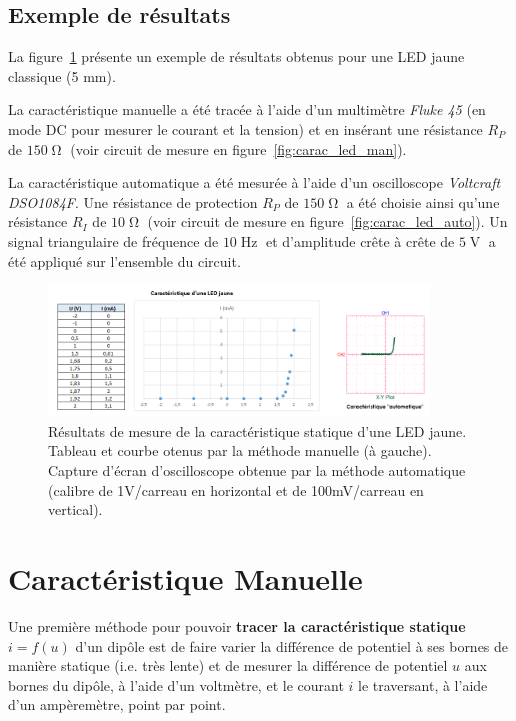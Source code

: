 \bigskip

\subsection{Exemple de résultats}

La figure~\ref{fig:carac_led} présente un exemple de résultats obtenus pour une LED jaune classique (5 mm).

La caractéristique manuelle a été tracée à l'aide d'un multimètre \textit{Fluke 45} (en mode DC pour mesurer le courant et la tension) et en insérant une résistance $R_P$ de $150\operatorname{\Omega}$ (voir circuit de mesure en figure~\ref{fig:carac_led_man}).

La caractéristique automatique a été mesurée à l'aide d'un oscilloscope \textit{Voltcraft DSO1084F}. Une résistance de protection $R_P$ de $150\operatorname{\Omega}$ a été choisie ainsi qu'une résistance $R_I$ de $10\operatorname{\Omega}$ (voir circuit de mesure en figure~\ref{fig:carac_led_auto}). Un signal triangulaire de fréquence de $10\operatorname{Hz}$ et d'amplitude crête à crête de $5\operatorname{V}$ a été appliqué sur l'ensemble du circuit. 



\begin{figure}[h!]
    \centering
	\includegraphics[width=0.9\textwidth]{images/caract_led_phd.png}

    \caption{Résultats de mesure de la caractéristique statique d'une LED jaune. Tableau et courbe otenus par la méthode manuelle (à gauche). Capture d'écran d'oscilloscope obtenue par la méthode automatique (calibre de 1V/carreau en horizontal et de 100mV/carreau en vertical).}
    \label{fig:carac_led}
\end{figure}

\newpage
\section{Caractéristique Manuelle}

Une première méthode pour pouvoir \textbf{tracer la caractéristique statique} $i=f(u)$ d'un dipôle est de faire varier la différence de potentiel à ses bornes de manière statique (i.e. très lente) et de mesurer la différence de potentiel $u$ aux bornes du dipôle, à l'aide d'un voltmètre, et le courant $i$ le traversant, à l'aide d'un ampèremètre, point par point.


